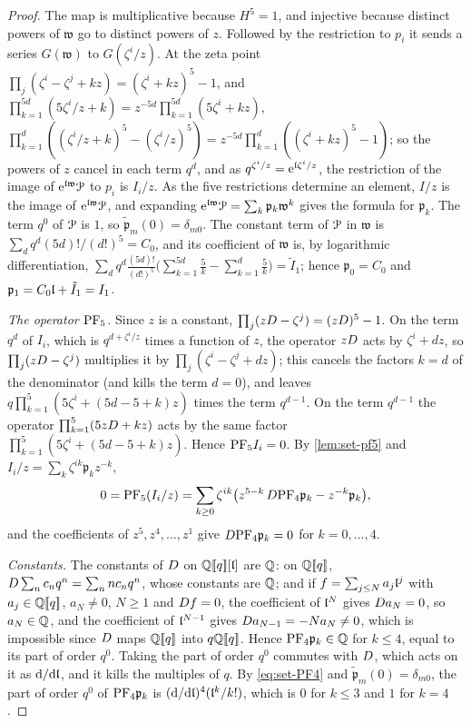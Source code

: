 \begin{proof}
The map is multiplicative because $H^5=1$, and injective because distinct powers of $\mathfrak w$ go to distinct powers of $z$. Followed by the restriction to $p_i$ it sends a series $G(\mathfrak w)$ to $G(\zeta^i/z)$. At the zeta point $\prod_j(\zeta^i-\zeta^j+kz)=(\zeta^i+kz)^5-1$, and $\prod_{k=1}^{5d}(5\zeta^i/z+k)=z^{-5d}\prod_{k=1}^{5d}(5\zeta^i+kz)$, $\prod_{k=1}^d((\zeta^i/z+k)^5-(\zeta^i/z)^5)=z^{-5d}\prod_{k=1}^d((\zeta^i+kz)^5-1)$; so the powers of $z$ cancel in each term $q^d$, and as $q^{\zeta^i/z}=\mathrm{e}^{\mathfrak{l}\zeta^i/z}$, the restriction of the image of $\mathrm{e}^{\mathfrak{l}\mathfrak w}\mathcal{P}$ to $p_i$ is $I_i/z$. As the five restrictions determine an element, $I/z$ is the image of $\mathrm{e}^{\mathfrak{l}\mathfrak w}\mathcal{P}$, and expanding $\mathrm{e}^{\mathfrak{l}\mathfrak w}\mathcal{P}=\sum_k\mathfrak p_k\mathfrak w^k$ gives the formula for $\mathfrak p_k$. The term $q^0$ of $\mathcal{P}$ is $1$, so $\tilde{\mathfrak p}_m(0)=\delta_{m0}$. The constant term of $\mathcal{P}$ in $\mathfrak w$ is $\sum_dq^d(5d)!/(d!)^5=C_0$, and its coefficient of $\mathfrak w$ is, by logarithmic differentiation, $\sum_dq^d\frac{(5d)!}{(d!)^5}\bigl(\sum_{k=1}^{5d}\frac5k-\sum_{k=1}^d\frac5k\bigr)=\tilde I_1$; hence $\mathfrak p_0=C_0$ and $\mathfrak p_1=C_0\mathfrak{l}+\tilde I_1=I_1$.

\emph{The operator $\mathrm{PF}_{5}$.} Since $z$ is a constant, $\prod_{j}(zD-\zeta^j)=(zD)^5-1$. On the term $q^d$ of $I_i$, which is $q^{d+\zeta^i/z}$ times a function of $z$, the operator $zD$ acts by $\zeta^i+dz$, so $\prod_j(zD-\zeta^j)$ multiplies it by $\prod_j(\zeta^i-\zeta^j+dz)$; this cancels the factors $k=d$ of the denominator (and kills the term $d=0$), and leaves $q\prod_{k=1}^5(5\zeta^i+(5d-5+k)z)$ times the term $q^{d-1}$. On the term $q^{d-1}$ the operator $\prod_{k=1}^5(5zD+kz)$ acts by the same factor $\prod_{k=1}^5(5\zeta^i+(5d-5+k)z)$. Hence $\mathrm{PF}_{5} I_i=0$. By \cref{lem:set-pf5} and $I_i/z=\sum_k\zeta^{ik}\mathfrak p_kz^{-k}$,
\[
0=\mathrm{PF}_{5}(I_i/z)=\sum_{k\geq0}\zeta^{ik}\bigl(z^{5-k}\,D\mathrm{PF}_{4}\mathfrak p_k-z^{-k}\mathfrak p_k\bigr),
\]
and the coefficients of $z^5,z^4,\dots,z^1$ give $D\mathrm{PF}_{4}\mathfrak p_k=0$ for $k=0,\dots,4$.

\emph{Constants.} The constants of $D$ on $\mathbb{Q}[\![ q ]\!][\mathfrak{l}]$ are $\mathbb{Q}$: on $\mathbb{Q}[\![ q ]\!]$, $D\sum_nc_nq^n=\sum_nnc_nq^n$, whose constants are $\mathbb{Q}$; and if $f=\sum_{j\leq N}a_j\mathfrak{l}^j$ with $a_j\in\mathbb{Q}[\![ q ]\!]$, $a_N\neq0$, $N\geq1$ and $D f=0$, the coefficient of $\mathfrak{l}^N$ gives $D a_N=0$, so $a_N\in\mathbb{Q}$, and the coefficient of $\mathfrak{l}^{N-1}$ gives $D a_{N-1}=-Na_N\neq0$, which is impossible since $D$ maps $\mathbb{Q}[\![ q ]\!]$ into $q\mathbb{Q}[\![ q ]\!]$. Hence $\mathrm{PF}_{4}\mathfrak p_k\in\mathbb{Q}$ for $k\leq4$, equal to its part of order $q^0$. Taking the part of order $q^0$ commutes with $D$, which acts on it as $\mathrm{d}/\mathrm{d}\mathfrak{l}$, and it kills the multiples of $q$. By \eqref{eq:set-PF4} and $\tilde{\mathfrak p}_m(0)=\delta_{m0}$, the part of order $q^0$ of $\mathrm{PF}_{4}\mathfrak p_k$ is $(\mathrm{d}/\mathrm{d}\mathfrak{l})^4(\mathfrak{l}^k/k!)$, which is $0$ for $k\leq3$ and $1$ for $k=4$.
\end{proof}

